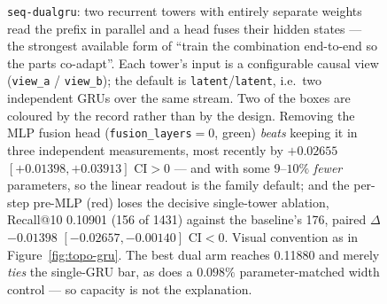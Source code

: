 \begin{figure}[ht]
  \caption{\texttt{seq-dualgru}: two recurrent towers with entirely separate
    weights read the prefix in parallel and a head fuses their hidden states
    --- the strongest available form of ``train the combination end-to-end so
    the parts co-adapt''. Each tower's input is a configurable causal view
    (\texttt{view\_a} / \texttt{view\_b}); the default is
    \texttt{latent}/\texttt{latent}, i.e.\ two independent GRUs over the same
    stream. Two of the boxes are coloured by the record rather than by the
    design. Removing the MLP fusion head (\texttt{fusion\_layers}${}=0$,
    green) \emph{beats} keeping it in three independent measurements, most
    recently by $+\num{0.02655}$ $[+0.01398, +0.03913]$ CI$>$0 --- and with
    some $9$--$10\%$ \emph{fewer} parameters, so the linear readout is the
    family default; and the
    per-step pre-MLP (red) loses the decisive single-tower ablation, Recall@10
    \num{0.10901} (\num{156} of \num{1431}) against the baseline's \num{176},
    paired $\Delta$ $-\num{0.01398}$ $[-0.02657, -0.00140]$ CI$<$0. Visual
    convention as in Figure~\ref{fig:topo-gru}. The best dual arm reaches
    \num{0.11880} and merely \emph{ties} the single-GRU bar, as does a
    $0.098\%$ parameter-matched width control --- so capacity is not the
    explanation.}
  \label{fig:topo-dualgru}
\end{figure}


